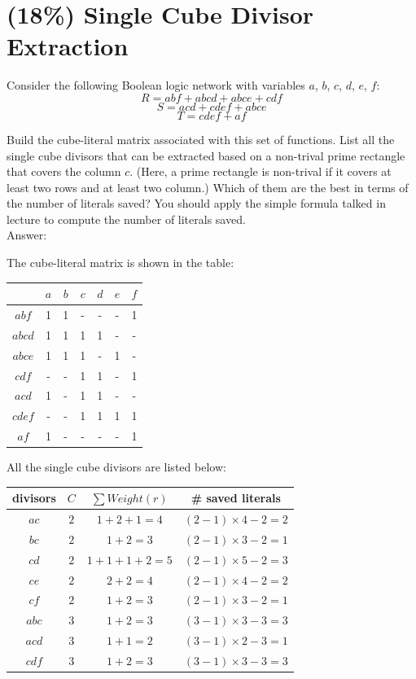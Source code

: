 \documentclass[12pt]{article}
\begin{document}
\section{(18\%) Single Cube Divisor Extraction}
Consider the following Boolean logic network with variables $a$, $b$, $c$, $d$, $e$, $f$:
\[R=abf+abcd+abce+cdf\]
\[S=acd+cdef+abce\]
\[T=cdef+af\]

Build the cube-literal matrix associated with this set of functions.
List all the single cube divisors that can be extracted based on a non-trival prime rectangle that covers the column $c$.
(Here, a prime rectangle is non-trival if it covers at least two rows and at least two column.)
Which of them are the best in terms of the number of literals saved?
You should apply the simple formula talked in lecture to compute the number of literals saved.\\

Answer:

The cube-literal matrix is shown in the table:
\begin{center}
    \tabcolsep=8pt
    \begin{tabular}{|c|cccccc|}
        \hline
        & $a$ & $b$ & $c$ & $d$ & $e$ & $f$ \\
        \hline
        $abf$  & 1 & 1 & - & - & - & 1 \\
        $abcd$ & 1 & 1 & 1 & 1 & - & - \\
        $abce$ & 1 & 1 & 1 & - & 1 & - \\
        $cdf$  & - & - & 1 & 1 & - & 1 \\
        $acd$  & 1 & - & 1 & 1 & - & - \\
        $cdef$ & - & - & 1 & 1 & 1 & 1 \\
        $af$   & 1 & - & - & - & - & 1 \\
        \hline
    \end{tabular}
\end{center}
All the single cube divisors are listed below:
\begin{center}
    \tabcolsep=8pt
    \begin{tabular}{|c|ccc|}
        \hline
        divisors & $C$   & $\sum Weight(r)$ & \# saved literals \\
        \hline
        $ac$     & $2$   & $1+2+1=4  $  & $(2-1)\times 4-2=2$\\
        $bc$     & $2$   & $1+2=3    $  & $(2-1)\times 3-2=1$\\
        $cd$     & $2$   & $1+1+1+2=5$  & $(2-1)\times 5-2=3$\\
        $ce$     & $2$   & $2+2=4    $  & $(2-1)\times 4-2=2$\\
        $cf$     & $2$   & $1+2=3    $  & $(2-1)\times 3-2=1$\\
        $abc$    & $3$   & $1+2=3    $  & $(3-1)\times 3-3=3$\\
        $acd$    & $3$   & $1+1=2    $  & $(3-1)\times 2-3=1$\\
        $cdf$    & $3$   & $1+2=3    $  & $(3-1)\times 3-3=3$\\
        \hline
    \end{tabular}
\end{center}
\end{document}
